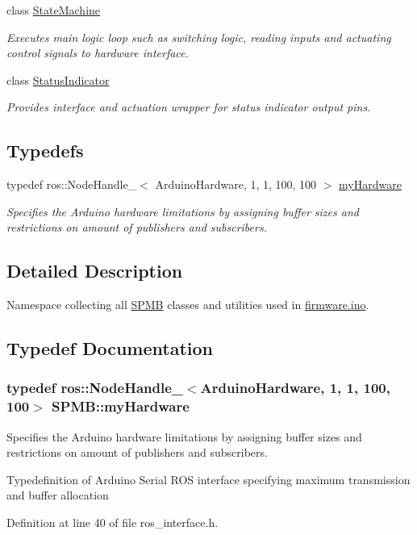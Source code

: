 \begin{DoxyCompactItemize}
class \hyperlink{classSPMB_1_1StateMachine}{State\+Machine}
\begin{DoxyCompactList}\small\item\em Executes main logic loop such as switching logic, reading inputs and actuating control signals to hardware interface. \end{DoxyCompactList}\item 
class \hyperlink{classSPMB_1_1StatusIndicator}{Status\+Indicator}
\begin{DoxyCompactList}\small\item\em Provides interface and actuation wrapper for status indicator output pins. \end{DoxyCompactList}\end{DoxyCompactItemize}
\subsection*{Typedefs}
\begin{DoxyCompactItemize}
\item 
typedef ros\+::\+Node\+Handle\+\_\+$<$ Arduino\+Hardware, 1, 1, 100, 100 $>$ \hyperlink{namespaceSPMB_a3dfee893976eb910fb3de34c228c2314}{my\+Hardware}
\begin{DoxyCompactList}\small\item\em Specifies the Arduino hardware limitations by assigning buffer sizes and restrictions on amount of publishers and subscribers. \end{DoxyCompactList}\end{DoxyCompactItemize}


\subsection{Detailed Description}
Namespace collecting all \hyperlink{namespaceSPMB}{S\+P\+MB} classes and utilities used in \hyperlink{firmware_8ino_source}{firmware.\+ino}. 

\subsection{Typedef Documentation}
\subsubsection[{\texorpdfstring{my\+Hardware}{myHardware}}]{\setlength{\rightskip}{0pt plus 5cm}typedef ros\+::\+Node\+Handle\+\_\+$<$Arduino\+Hardware, 1, 1, 100, 100$>$ {\bf S\+P\+M\+B\+::my\+Hardware}}\hypertarget{namespaceSPMB_a3dfee893976eb910fb3de34c228c2314}{}\label{namespaceSPMB_a3dfee893976eb910fb3de34c228c2314}


Specifies the Arduino hardware limitations by assigning buffer sizes and restrictions on amount of publishers and subscribers. 

Typedefinition of Arduino Serial R\+OS interface specifying maximum transmission and buffer allocation 

Definition at line 40 of file ros\+\_\+interface.\+h.

